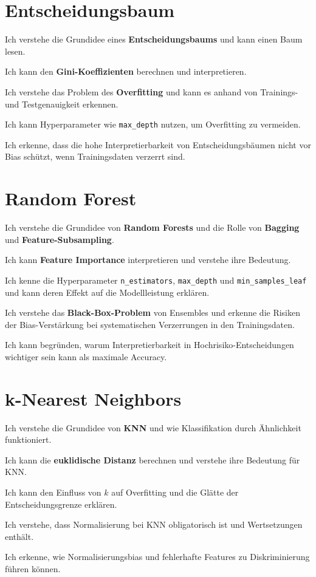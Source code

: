 \section{Entscheidungsbaum}
\begin{todolist}
    \item Ich verstehe die Grundidee eines \textbf{Entscheidungsbaums} und kann einen Baum lesen.
    \item Ich kann den \textbf{Gini-Koeffizienten} berechnen und interpretieren.
    \item Ich verstehe das Problem des \textbf{Overfitting} und kann es anhand von Trainings- und Testgenauigkeit erkennen.
    \item Ich kann Hyperparameter wie \texttt{max\_depth} nutzen, um Overfitting zu vermeiden.
    \item Ich erkenne, dass die hohe Interpretierbarkeit von Entscheidungsbäumen nicht vor Bias schützt, wenn Trainingsdaten verzerrt sind.
\end{todolist}

\section{Random Forest}
\begin{todolist}
    \item Ich verstehe die Grundidee von \textbf{Random Forests} und die Rolle von \textbf{Bagging} und \textbf{Feature-Subsampling}.
    \item Ich kann \textbf{Feature Importance} interpretieren und verstehe ihre Bedeutung.
    \item Ich kenne die Hyperparameter \texttt{n\_estimators}, \texttt{max\_depth} und \texttt{min\_samples\_leaf} und kann deren Effekt auf die Modellleistung erklären.
    \item Ich verstehe das \textbf{Black-Box-Problem} von Ensembles und erkenne die Risiken der Bias-Verstärkung bei systematischen Verzerrungen in den Trainingsdaten.
    \item Ich kann begründen, warum Interpretierbarkeit in Hochrisiko-Entscheidungen wichtiger sein kann als maximale Accuracy.
\end{todolist}

\section{k-Nearest Neighbors}
\begin{todolist}
    \item Ich verstehe die Grundidee von \textbf{KNN} und wie Klassifikation durch Ähnlichkeit funktioniert.
    \item Ich kann die \textbf{euklidische Distanz} berechnen und verstehe ihre Bedeutung für KNN.
    \item Ich kann den Einfluss von $k$ auf Overfitting und die Glätte der Entscheidungsgrenze erklären.
    \item Ich verstehe, dass Normalisierung bei KNN obligatorisch ist und Wertsetzungen enthält.
    \item Ich erkenne, wie Normalisierungsbias und fehlerhafte Features zu Diskriminierung führen können.
\end{todolist}

